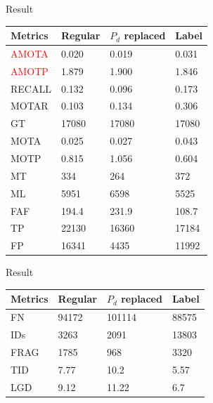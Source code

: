 \documentclass[aspectratio=169,xcolor=dvipsnames]{beamer}
\begin{document}
\begin{frame}{Result}
    \begin{table}
        \begin{tabular}{l l l l}
            \toprule
            Metrics & Regular & $P_d$ replaced & Label\\
            \midrule
            \textcolor{red}{AMOTA}        &0.020 & 0.019          &0.031               \\
            \textcolor{red}{AMOTP}     &1.879   & 1.900          & 1.846               \\
            RECALL     &0.132    & 0.096           & 0.173               \\
            MOTAR     &0.103    & 0.134          & 0.306               \\
            GT     &17080    & 17080          & 17080               \\
            MOTA     &0.025    & 0.027          & 0.043               \\
            MOTP     &0.815    & 1.056          & 0.604               \\
            MT     &334    & 264           & 372               \\
            ML     &5951    & 6598           & 5525               \\
            
            FAF     &194.4    & 231.9          & 108.7              \\
            TP     &22130    & 16360          & 17184               \\
            FP     &16341    & 4435          & 11992               \\

            \bottomrule
        \end{tabular}
    \end{table}
\end{frame}


\begin{frame}{Result}
    \begin{table}
        \begin{tabular}{l l l l}
            \toprule
            Metrics & Regular & $P_d$ replaced & Label\\
            \midrule
            FN     &94172    & 101114         & 88575               \\
            IDs     &3263    & 2091          & 13803               \\
            FRAG     &1785    & 968           & 3320               \\
            TID     &7.77    & 10.2           & 5.57               \\
            LGD     &9.12    & 11.22           & 6.7             \\

            \bottomrule
        \end{tabular}
    \end{table}
\end{frame}
\end{document}
